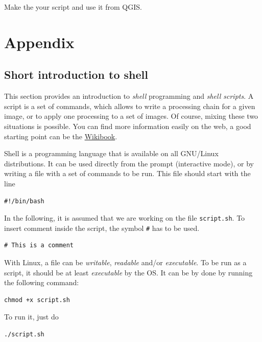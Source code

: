 \documentclass[a4paper,11pt,DIV=18]{scrartcl}
\begin{document}
\begin{work}
Make the your script and use it from QGIS.
\end{work}
\section{Appendix}
\label{sec:org703fb7f}
\subsection{Short introduction to shell}
\label{sec:org6080975}
This section provides  an introduction to \emph{shell}  programming and \emph{shell
scripts}.   A script  is a  set of  commands, which  allows to  write a
processing chain  for a given image,  or to apply one  processing to a
set  of   images.   Of   course,  mixing   these  two   situations  is
possible. You  can find  more information  easily on  the web,  a good
starting point can be the \href{https://en.wikibooks.org/wiki/Bash\_Shell\_Scripting}{Wikibook}.

Shell is  a programming  language that is  available on  all GNU/Linux
distributions. It  can be used  directly from the  prompt (interactive
mode), or  by writing a file  with a set  of commands to be  run. This
file should start with the line

\begin{verbatim}
#!/bin/bash
\end{verbatim}
In  the following,  it is  assumed  that we  are working  on the  file
\texttt{script.sh}. To insert comment inside the script, the symbol \texttt{\#} has to be
used.

\begin{verbatim}
# This is a comment
\end{verbatim}
With Linux, a file can be  \emph{writable}, \emph{readable} and/or \emph{executable}. To be
run as a script, it should be at least \emph{executable} by the OS. It can be
by done by running the following command:

\begin{verbatim}
chmod +x script.sh
\end{verbatim}
To run it, just do

\begin{verbatim}
./script.sh
\end{verbatim}
\end{document}

